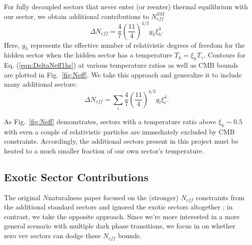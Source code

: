 \documentclass[nofootinbib,twocolumn,preprintnumbers]{revtex4-1}
\begin{document}
For fully decoupled sectors that never enter (or reenter) thermal equilibrium with our sector, we obtain additional contributions to $N^{SM}_{eff}$ \cite{Breitbach:2018ddu}
\begin{equation}\label{eqn:DeltaNeff1hs}
\Delta N_{eff} = \frac{4}{7}\left(\frac{11}{4}\right)^{4/3}g_h \xi_h^4.
\end{equation} 
Here, $g_h$ represents the effective number of relativistic degrees of freedom for the hidden sector when the hidden sector has a temperature $T_h = \xi_h T_\gamma$. Contours for Eq. (\ref{eqn:DeltaNeff1hs}) at various temperature ratios as well as CMB bounds are plotted in Fig.~\ref{fig:Neff}. We take this approach and generalize it to include many additional sectors:
\begin{equation}\label{eqn:DeltaNeff}
\Delta N_{eff} = \sum_i \frac{4}{7}\left(\frac{11}{4}\right)^{4/3}g_{i} \xi^4_{i}.
\end{equation} 

As Fig.~\ref{fig:Neff}  demonstrates, sectors with a temperature ratio above $\xi_h\sim 0.5$ with even a couple of relativistic particles are immediately excluded by CMB constraints. Accordingly, the additional sectors present in this project must be heated to a much smaller fraction of our own sector's temperature. 

\subsection{Exotic Sector Contributions}

The original $N$naturalness paper focused on the (stronger) $N_{eff}$ constraints from the additional standard sectors and ignored the exotic sectors altogether \cite{Arkani-Hamed:2016rle}; in contrast, we take the opposite approach. Since we're more interested in a more general scenario with multiple dark phase transitions, we focus in on whether zero vev sectors can dodge these $N_{eff}$ bounds.
\end{document}
